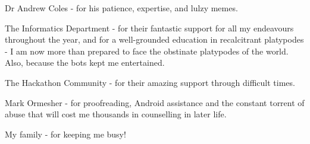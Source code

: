 Dr Andrew Coles - for his patience, expertise, and lulzy memes.
\vspace{2mm}

The Informatics Department - for their fantastic support for all my endeavours throughout the year, and for a well-grounded education in recalcitrant platypodes - I am now more than prepared to face the obstinate platypodes of the world. Also, because the bots kept me entertained.
\vspace{2mm}

The Hackathon Community - for their amazing support through difficult times.

\vspace{2mm}
Mark Ormesher - for proofreading, Android assistance and the constant torrent of abuse that will cost me thousands in counselling in later life.

\vspace{2mm}
My family - for keeping me busy!